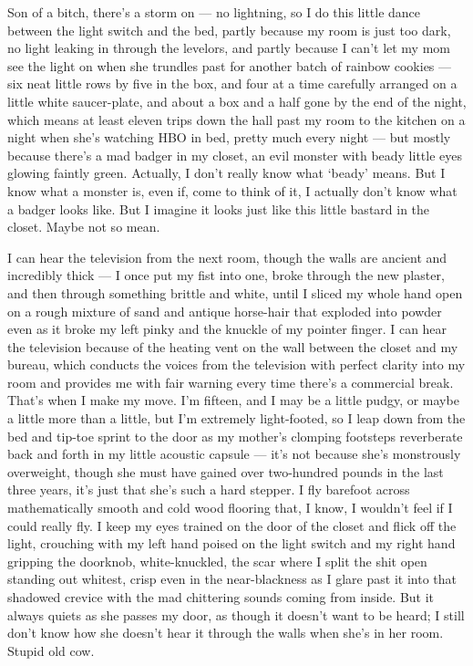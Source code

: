 Son of a bitch, there's a storm on --- no lightning, so I
do this little dance between the light switch and the bed, partly
because my room is just too dark, no light leaking in through the
levelors, and partly because I can't let my mom see the light
on when she trundles past for another batch of rainbow cookies
--- six neat little rows by five in the box, and four at a time
carefully arranged on a little white saucer-plate, and about a box
and a half gone by the end of the night, which means at least
eleven trips down the hall past my room to the kitchen on a night
when she's watching HBO in bed, pretty much every night
--- but mostly because there's a mad badger in my closet,
an evil monster with beady little eyes glowing faintly green.
Actually, I don't really know what `beady' means.
But I know what a monster is, even if, come to think of it, I
actually don't know what a badger looks like. But I imagine
it looks just like this little bastard in the closet. Maybe not so
mean.

I can hear the television from the next room, though the walls are
ancient and incredibly thick --- I once put my fist into one,
broke through the new plaster, and then through something brittle
and white, until I sliced my whole hand open on a rough mixture of
sand and antique horse-hair that exploded into powder even as it
broke my left pinky and the knuckle of my pointer finger. I can
hear the television because of the heating vent on the wall between
the closet and my bureau, which conducts the voices from the
television with perfect clarity into my room and provides me with
fair warning every time there's a commercial break.
That's when I make my move. I'm fifteen, and I may be a
little pudgy, or maybe a little more than a little, but I'm
extremely light-footed, so I leap down from the bed and tip-toe
sprint to the door as my mother's clomping footsteps
reverberate back and forth in my little acoustic capsule ---
it's not because she's monstrously overweight, though
she must have gained over two-hundred pounds in the last three
years, it's just that she's such a hard stepper. I fly
barefoot across mathematically smooth and cold wood flooring that,
I know, I wouldn't feel if I could really fly. I keep my eyes
trained on the door of the closet and flick off the light,
crouching with my left hand poised on the light switch and my right
hand gripping the doorknob, white-knuckled, the scar where I split
the shit open standing out whitest, crisp even in the
near-blackness as I glare past it into that shadowed crevice with
the mad chittering sounds coming from inside. But it always quiets
as she passes my door, as though it doesn't want to be heard;
I still don't know how she doesn't hear it through the
walls when she's in her room. Stupid old cow.

